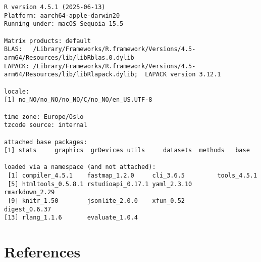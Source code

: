 \documentclass[
  a4paper,
]{article}
\begin{document}
\begin{verbatim}
R version 4.5.1 (2025-06-13)
Platform: aarch64-apple-darwin20
Running under: macOS Sequoia 15.5

Matrix products: default
BLAS:   /Library/Frameworks/R.framework/Versions/4.5-arm64/Resources/lib/libRblas.0.dylib 
LAPACK: /Library/Frameworks/R.framework/Versions/4.5-arm64/Resources/lib/libRlapack.dylib;  LAPACK version 3.12.1

locale:
[1] no_NO/no_NO/no_NO/C/no_NO/en_US.UTF-8

time zone: Europe/Oslo
tzcode source: internal

attached base packages:
[1] stats     graphics  grDevices utils     datasets  methods   base     

loaded via a namespace (and not attached):
 [1] compiler_4.5.1    fastmap_1.2.0     cli_3.6.5         tools_4.5.1      
 [5] htmltools_0.5.8.1 rstudioapi_0.17.1 yaml_2.3.10       rmarkdown_2.29   
 [9] knitr_1.50        jsonlite_2.0.0    xfun_0.52         digest_0.6.37    
[13] rlang_1.1.6       evaluate_1.0.4   
\end{verbatim}

\section*{References}\label{references}
\end{document}

